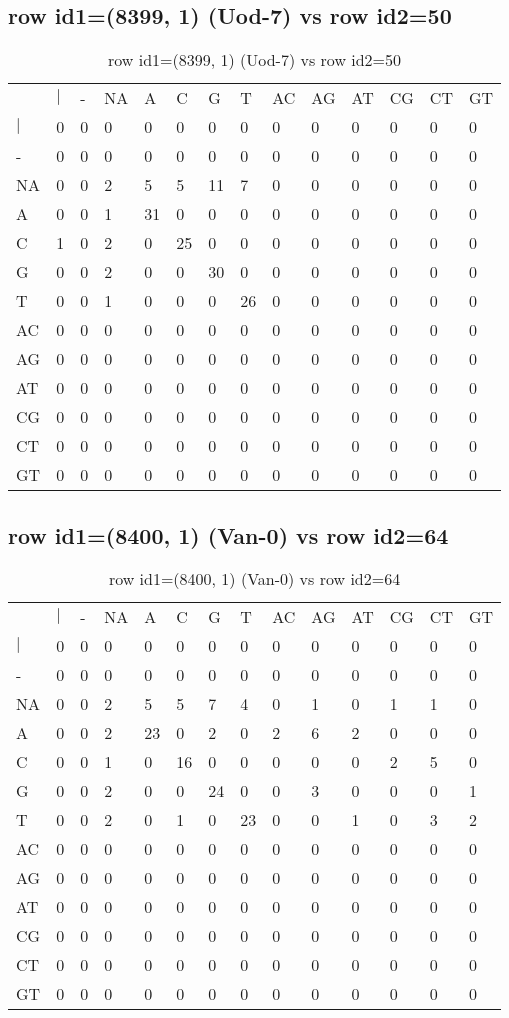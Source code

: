 \subsection{row id1=(8399, 1) (Uod-7) vs row id2=50}
\begin{center}
\begin{longtable}{|l|l|l|l|l|l|l|l|l|l|l|l|l|l|}
\caption{row id1=(8399, 1) (Uod-7) vs row id2=50} \label{table_dm466}\\
\hline
\\
\hline
&$|$&-&NA&A&C&G&T&AC&AG&AT&CG&CT&GT\\
$|$&0&0&0&0&0&0&0&0&0&0&0&0&0\\
-&0&0&0&0&0&0&0&0&0&0&0&0&0\\
NA&0&0&2&5&5&11&7&0&0&0&0&0&0\\
A&0&0&1&31&0&0&0&0&0&0&0&0&0\\
C&1&0&2&0&25&0&0&0&0&0&0&0&0\\
G&0&0&2&0&0&30&0&0&0&0&0&0&0\\
T&0&0&1&0&0&0&26&0&0&0&0&0&0\\
AC&0&0&0&0&0&0&0&0&0&0&0&0&0\\
AG&0&0&0&0&0&0&0&0&0&0&0&0&0\\
AT&0&0&0&0&0&0&0&0&0&0&0&0&0\\
CG&0&0&0&0&0&0&0&0&0&0&0&0&0\\
CT&0&0&0&0&0&0&0&0&0&0&0&0&0\\
GT&0&0&0&0&0&0&0&0&0&0&0&0&0\\
\hline
\end{longtable}
\end{center}

\subsection{row id1=(8400, 1) (Van-0) vs row id2=64}
\begin{center}
\begin{longtable}{|l|l|l|l|l|l|l|l|l|l|l|l|l|l|}
\caption{row id1=(8400, 1) (Van-0) vs row id2=64} \label{table_dm468}\\
\hline
\\
\hline
&$|$&-&NA&A&C&G&T&AC&AG&AT&CG&CT&GT\\
$|$&0&0&0&0&0&0&0&0&0&0&0&0&0\\
-&0&0&0&0&0&0&0&0&0&0&0&0&0\\
NA&0&0&2&5&5&7&4&0&1&0&1&1&0\\
A&0&0&2&23&0&2&0&2&6&2&0&0&0\\
C&0&0&1&0&16&0&0&0&0&0&2&5&0\\
G&0&0&2&0&0&24&0&0&3&0&0&0&1\\
T&0&0&2&0&1&0&23&0&0&1&0&3&2\\
AC&0&0&0&0&0&0&0&0&0&0&0&0&0\\
AG&0&0&0&0&0&0&0&0&0&0&0&0&0\\
AT&0&0&0&0&0&0&0&0&0&0&0&0&0\\
CG&0&0&0&0&0&0&0&0&0&0&0&0&0\\
CT&0&0&0&0&0&0&0&0&0&0&0&0&0\\
GT&0&0&0&0&0&0&0&0&0&0&0&0&0\\
\hline
\end{longtable}
\end{center}

